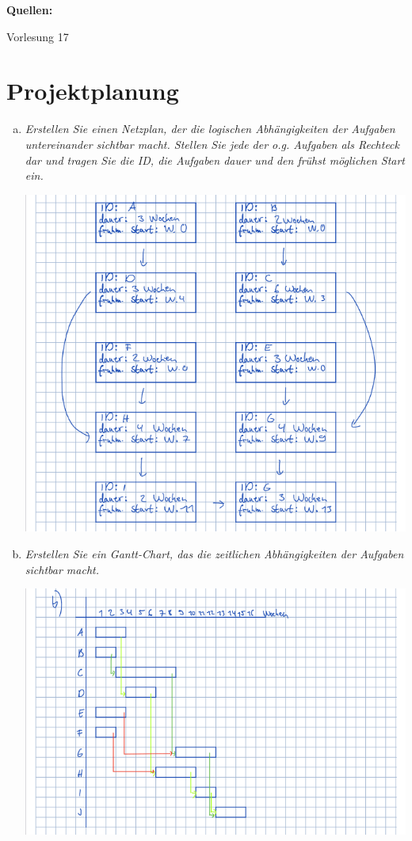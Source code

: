 \textbf{Quellen:}
\begin{enumerate}[{[1]}]
    \item Vorlesung 17
\end{enumerate}

\newpage
\section{Projektplanung}
\begin{enumerate}[(a)]
    \item {\itshape Erstellen Sie einen Netzplan, der die logischen Abhängigkeiten der Aufgaben untereinander sichtbar macht. Stellen Sie jede der o.g. Aufgaben als Rechteck dar und tragen Sie die ID, die Aufgaben dauer und den frühst möglichen Start ein.}
    
    \includegraphics[width=1\textwidth]{src/u12/task3/a.png} 
    
\newpage
    \item {\itshape Erstellen Sie ein Gantt-Chart, das die zeitlichen Abhängigkeiten der Aufgaben sichtbar macht.}
    
    \includegraphics[width=1\textwidth]{src/u12/task3/b.png} 


\end{enumerate}

